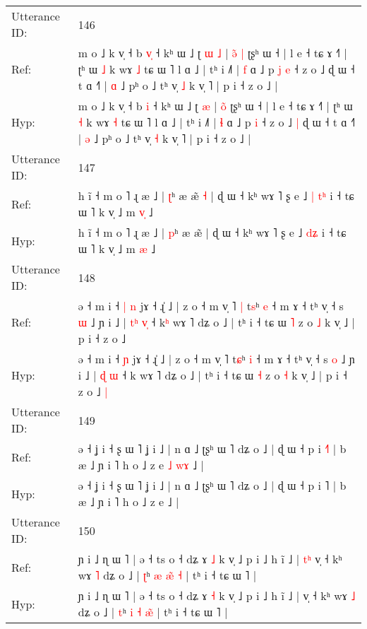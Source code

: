 \documentclass[10pt]{article}
\DeclareRobustCommand{\hl}[1]{{\textcolor{red}{#1}}}
\begin{document}
\begin{longtable}{ll}
 \\
\midrule
Utterance ID: & 146 \\
Ref: & m o ˩ k v̩ ˧ b \hl{v}\hl{̩} ˧ kʰ ɯ ˩ ʈ\hl{ }\hl{ɯ} \hl{˩} | \hl{ə}̃\hl{ }\hl{|} ʈʂʰ ɯ ˧ | l e ˧ tɕ ɤ ˧˥ | ʈʰ ɯ \hl{˩} k wɤ \hl{˩} tɕ ɯ ˥ l ɑ ˩ | tʰ i ˩˥ | \hl{f} ɑ ˩ p\hl{ }\hl{j} \hl{e} ˧ z o ˩\hl{}\hl{} ɖ ɯ ˧ t ɑ ˧˥ | \hl{ɑ} ˩ pʰ o ˩ tʰ v̩ \hl{˩} k v̩ ˥ | p i ˧ z o ˩ |
 \\
Hyp: & m o ˩ k v̩ ˧ b \hl{}\hl{i} ˧ kʰ ɯ ˩ ʈ\hl{}\hl{} \hl{æ} | \hl{o}̃\hl{}\hl{} ʈʂʰ ɯ ˧ | l e ˧ tɕ ɤ ˧˥ | ʈʰ ɯ \hl{˧} k wɤ \hl{˧} tɕ ɯ ˥ l ɑ ˩ | tʰ i ˩˥ | \hl{ɬ} ɑ ˩ p\hl{}\hl{} \hl{i} ˧ z o ˩\hl{ }\hl{|} ɖ ɯ ˧ t ɑ ˧˥ | \hl{ə} ˩ pʰ o ˩ tʰ v̩ \hl{˧} k v̩ ˥ | p i ˧ z o ˩ |
 \\
\midrule
Utterance ID: & 147 \\
Ref: & h ĩ ˧ m o ˥ ɻ æ ˩ | \hl{ʈ}ʰ æ æ̃\hl{ }\hl{˧} | ɖ ɯ ˧ kʰ wɤ ˥ ʂ e ˩\hl{ }\hl{|} \hl{t}\hl{ʰ} i ˧ tɕ ɯ ˥ k v̩ ˩ m \hl{v}\hl{̩} ˩
 \\
Hyp: & h ĩ ˧ m o ˥ ɻ æ ˩ | \hl{p}ʰ æ æ̃\hl{}\hl{} | ɖ ɯ ˧ kʰ wɤ ˥ ʂ e ˩\hl{}\hl{} \hl{d}\hl{ʑ} i ˧ tɕ ɯ ˥ k v̩ ˩ m \hl{}\hl{æ} ˩
 \\
\midrule
Utterance ID: & 148 \\
Ref: & ə ˧ m i ˧\hl{ }\hl{|} \hl{n} jɤ ˧ ɻ̍ ˩ | z o ˧ m v̩ ˥\hl{ }\hl{|} t\hl{s}ʰ \hl{e} ˧ m ɤ ˧ tʰ v̩ ˧ s \hl{ɯ} ˩ ɲ i ˩ | \hl{t}\hl{ʰ} \hl{v}\hl{̩} ˧ k\hl{ʰ} wɤ ˥ dʑ o ˩ | tʰ i ˧ tɕ ɯ \hl{˥} z o \hl{˩} k v̩ ˩ | p i ˧ z o ˩\hl{}\hl{}
 \\
Hyp: & ə ˧ m i ˧\hl{}\hl{} \hl{ɲ} jɤ ˧ ɻ̍ ˩ | z o ˧ m v̩ ˥\hl{}\hl{} t\hl{ɕ}ʰ \hl{i} ˧ m ɤ ˧ tʰ v̩ ˧ s \hl{o} ˩ ɲ i ˩ | \hl{}\hl{ɖ} \hl{}\hl{ɯ} ˧ k\hl{} wɤ ˥ dʑ o ˩ | tʰ i ˧ tɕ ɯ \hl{˧} z o \hl{˧} k v̩ ˩ | p i ˧ z o ˩\hl{ }\hl{|}
 \\
\midrule
Utterance ID: & 149 \\
Ref: & ə ˧ ʝ i ˧ ʂ ɯ ˥ ʝ i ˩ | n ɑ ˩ ʈʂʰ ɯ ˥ dʑ o ˩ | ɖ ɯ ˧ p i \hl{˧}˥ | b æ ˩ ɲ i ˥ h o ˩ z e\hl{ }\hl{˩}\hl{ }\hl{w}\hl{ɤ} ˩ |
 \\
Hyp: & ə ˧ ʝ i ˧ ʂ ɯ ˥ ʝ i ˩ | n ɑ ˩ ʈʂʰ ɯ ˥ dʑ o ˩ | ɖ ɯ ˧ p i \hl{}˥ | b æ ˩ ɲ i ˥ h o ˩ z e\hl{}\hl{}\hl{}\hl{}\hl{} ˩ |
 \\
\midrule
Utterance ID: & 150 \\
Ref: & ɲ i ˩ ɳ ɯ ˥ | ə ˧ ts o ˧ dʑ ɤ \hl{˩} k v̩ ˩ p i ˩ h ĩ ˩ |\hl{ }\hl{t}\hl{ʰ} v̩ ˧ kʰ wɤ \hl{˥} dʑ o ˩ | \hl{ʈ}ʰ \hl{æ} \hl{æ}\hl{̃}\hl{ }\hl{˧} | tʰ i ˧ tɕ ɯ ˥ |
 \\
Hyp: & ɲ i ˩ ɳ ɯ ˥ | ə ˧ ts o ˧ dʑ ɤ \hl{˧} k v̩ ˩ p i ˩ h ĩ ˩ |\hl{}\hl{}\hl{} v̩ ˧ kʰ wɤ \hl{˩} dʑ o ˩ | \hl{t}ʰ \hl{i} \hl{˧}\hl{ }\hl{æ}\hl{̃} | tʰ i ˧ tɕ ɯ ˥ |

\end{longtable}
\end{document}
